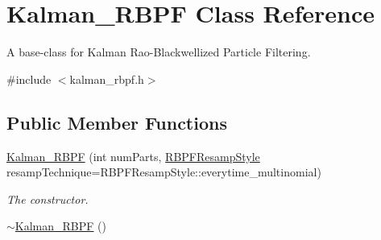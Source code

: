 \hypertarget{classKalman__RBPF}{}\section{Kalman\+\_\+\+R\+B\+PF Class Reference}
\label{classKalman__RBPF}


A base-\/class for Kalman Rao-\/\+Blackwellized Particle Filtering.  




{\ttfamily \#include $<$kalman\+\_\+rbpf.\+h$>$}

\subsection*{Public Member Functions}
\begin{DoxyCompactItemize}
\item 
\hyperlink{classKalman__RBPF_aa7130565819b45f993100dbf7f048c37}{Kalman\+\_\+\+R\+B\+PF} (int num\+Parts, \hyperlink{kalman__rbpf_8h_ad3790b392be9413a27de33728aad31e2}{R\+B\+P\+F\+Resamp\+Style} resamp\+Technique=R\+B\+P\+F\+Resamp\+Style\+::everytime\+\_\+multinomial)
\begin{DoxyCompactList}\small\item\em The constructor. \end{DoxyCompactList}\item 
\hyperlink{classKalman__RBPF_a454f1736e8889904f755ca904f6eebc0}{$\sim$\+Kalman\+\_\+\+R\+B\+PF} ()\hypertarget{classKalman__RBPF_a454f1736e8889904f755ca904f6eebc0}{}\label{classKalman__RBPF_a454f1736e8889904f755ca904f6eebc0}


\end{DoxyCompactItemize}

